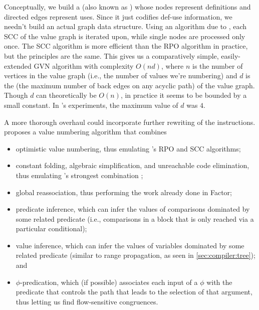 Conceptually, we build a  (also known as  \autocite{Simpson}) whose nodes represent definitions and directed edges
represent uses.  Since it just codifies def-use information, we needn't build
an actual graph data structure.  Using an algorithm due to \citeauthor{Tarjan}
\autocite*{Tarjan}, each \gls{SCC} of the value graph is iterated upon, while
single nodes are processed only once.  The \gls{SCC} algorithm is more
efficient than the \gls{RPO} algorithm in practice, but the principles are the
same.  This gives us a comparatively simple, easily-extended \gls{GVN}
algorithm with complexity $O(nd)$, where $n$ is the number of vertices in the
value graph (i.e., the number of values we're numbering) and $d$ is the
 (the maximum number of back edges on any acyclic
path) of the value graph.  Though $d$ can theoretically be $O(n)$, in practice
it seems to be bounded by a small constant.  In \citeauthor{Simpson}'s
experiments, the maximum value of $d$ was $4$.

A more thorough overhaul could incorporate further rewriting of the
instructions.   \autocite*{Gargi} proposes a
 value numbering algorithm that combines
\begin{itemize}
  \item optimistic value numbering, thus emulating \citeauthor{Simpson}'s
        \gls{RPO} and \gls{SCC} algorithms; 
  \item constant folding, algebraic simplification, and unreachable code
        elimination, thus emulating \citeauthor{Click}'s strongest combination
        \autocite{Click};
  \item global reassociation, thus performing the work already done in Factor;
  \item predicate inference, which can infer the values of comparisons
        dominated by some related predicate (i.e., comparisons in a block that
        is only reached via a particular conditional);
  \item value inference, which can infer the values of variables dominated by
        some related predicate (similar to range propagation, as seen in
        \cref{sec:compiler:tree}); and
  \item $\phi$-predication, which (if possible) associates each input of a
        $\phi$ with the predicate that controls the path that leads to the
        selection of that argument, thus letting us find flow-sensitive
        congruences.
\end{itemize}

